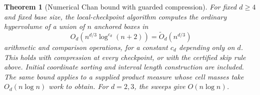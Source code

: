 \documentclass[12pt,a4paper]{article}
\newtheorem{theorem}{Theorem}[section]
\theoremstyle{definition}
\newcommand{\wtO}{\widetilde O}
\begin{document}
\begin{samepage}
\begin{theorem}[Numerical Chan bound with guarded compression]
\label{thm:main}
For fixed $d\ge4$ and fixed base size, the local-checkpoint algorithm
computes the ordinary hypervolume of a union of $n$ anchored boxes in
\begin{equation}
                   O_d(n^{d/3}\log^{c_d}(n+2))
                       =\wtO_d(n^{d/3})
 \label{eq:mainbound}
\end{equation}
arithmetic and comparison operations, for a constant $c_d$ depending
only on $d$. This holds with compression at every checkpoint, or with
the certified skip rule above. Initial coordinate sorting and interval
length construction are included. The same bound applies to a supplied
product measure whose cell masses take $O_d(n\log n)$ work to obtain.
For $d=2,3$, the sweeps give $O(n\log n)$.
\end{theorem}
\end{samepage}
\end{document}
